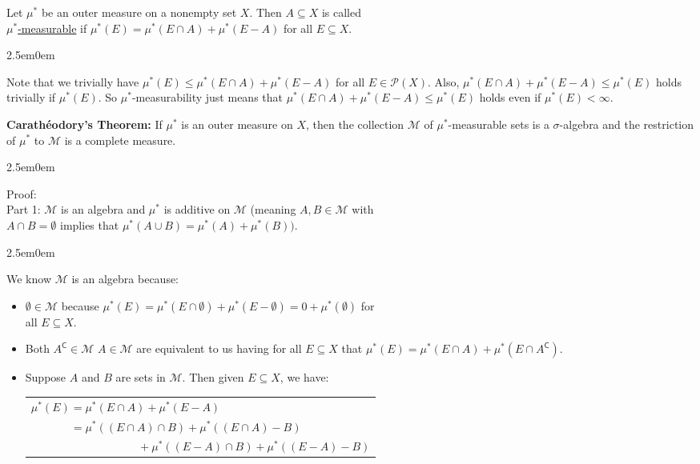 \documentclass{book}
\newcommand{\hTwo}{%
\color{MidnightBlue}%
   \fontsize{13}{15}\selectfont%
}
\newcommand{\hThree}{%
   \color{PineGreen!85!Orange}
   \fontsize{12}{14}\selectfont%
}
\newcommand{\hFour}{%
   \color{Cyan!80!black}
   \fontsize{12}{14}\selectfont%
}
\newcommand{\teachComment}{
   \color{Orange}%
   \fontsize{12}{14}\selectfont%
}
\newenvironment{myIndent}{%
   \begin{adjustwidth}{2.5em}{0em}%
}{%
   \end{adjustwidth}%
}
\newcommand{\udefine}[1]{{%
   \setulcolor{Red}%
   \setul{0.14em}{0.07em}%
   \ul{#1}%
}}
\newcommand{\blab}[1]{\textbf{#1}}
\newcommand{\comp}{\mathsf{C}}
\newcommand{\retTwo}{\hfill\bigbreak}
\begin{document}
Let $\mu^*$ be an outer measure on a nonempty set $X$. Then $A \subseteq X$ is called\\ \udefine{$\mu^*$-measurable} if $\mu^*(E) = \mu^*(E \cap A) + \mu^*(E - A)$ for all $E \subseteq X$.
\begin{myIndent}\teachComment
   Note that we trivially have $\mu^*(E) \leq \mu^*(E \cap A) + \mu^*(E - A)$ for all $E \in \mathcal{P}(X)$. Also, $\mu^*(E \cap A) + \mu^*(E - A) \leq \mu^*(E)$ holds trivially if $\mu^*(E)$. So $\mu^*$-measurability just means that $\mu^*(E \cap A) + \mu^*(E - A) \leq \mu^*(E)$ holds even if $\mu^*(E) < \infty$.\retTwo

   \hTwo\blab{Carathéodory's Theorem:} If $\mu^*$ is an outer measure on $X$, then the collection $\mathcal{M}$ of $\mu^*$-measurable sets is a $\sigma$-algebra and the restriction of $\mu^*$ to $\mathcal{M}$ is a complete measure.
   
   \begin{myIndent}\hThree
      Proof:\\
      Part 1: $\mathcal{M}$ is an algebra and $\mu^*$ is additive on $\mathcal{M}$ (meaning $A, B \in \mathcal{M}$ with\\ $A \cap B = \emptyset$ implies that $\mu^*(A \cup B) = \mu^*(A) + \mu^*(B))$.
      
      \begin{myIndent}\hFour
         We know $\mathcal{M}$ is an algebra because:
         \begin{itemize}
            \item $\emptyset \in \mathcal{M}$ because $\mu^*(E) = \mu^*(E \cap \emptyset) + \mu^*(E - \emptyset) = 0 + \mu^*(\emptyset)$ for\\ all $E \subseteq X$.\newpage
            \item Both $A^\comp \in \mathcal{M}$ $A \in \mathcal{M}$ are equivalent to us having for all $E \subseteq X$ that $\mu^*(E) = \mu^*(E \cap A) + \mu^*(E \cap A^\comp)$.\\ [-6pt]
            \item Suppose $A$ and $B$ are sets in $\mathcal{M}$. Then given $E \subseteq X$, we have:
            
            {\centering 
            \begin{tabular}{l}
               $\mu^*(E) = \mu^*(E \cap A) + \mu^*(E - A)$\\
               $\phantom{\mu^*(E)} = \mu^*((E \cap A) \cap B) + \mu^*((E \cap A) - B)$\\ $\phantom{aaaaaaaaaaaaaaaaaa} + \mu^*((E - A) \cap B) + \mu^*((E - A) - B)$
            \end{tabular} \retTwo\par}


\end{itemize}
\end{myIndent}
\end{myIndent}
\end{myIndent}
\end{document}

